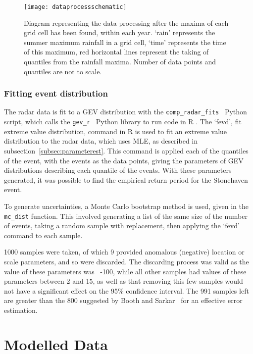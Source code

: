 \begin{figure}[H]
    \centering
    \texttt{[image: dataprocessschematic]}
    \caption[Diagram representing the data processing.]{
        Diagram representing the data processing after the maxima of each grid cell has been found,
    within each year.
    `rain' represents the summer maximum rainfall in a grid cell,
        `time' represents the time of this maximum,
        red horizontal lines represent the taking of quantiles from the rainfall maxima.
    Number of data points and quantiles are not to scale.}
    \label{fig:dataprocessschematic}
\end{figure}

\subsubsection{Fitting event distribution}

The radar data is fit to a GEV distribution with the \texttt{comp\_radar\_fits}~\cite{Me_Code} Python script,
    which calls the \texttt{gev\_r}~\cite{Me_Code} Python library to run code in R .
The `fevd', fit extreme value distribution,
    command in R is used to fit an extreme value distribution to the radar data,
    which uses MLE, as described in subsection~\ref{subsec:parameterest}.
This command is applied each of the quantiles of the event,
    with the events as the data points,
    giving the parameters of GEV distributions describing each quantile of the events.
With these parameters generated,
     it was possible to find the empirical return period for the Stonehaven event.

To generate uncertainties,
    a Monte Carlo bootstrap method is used,
    given in the \texttt{mc\_dist} function.
This involved generating a list of the same size of the number of events,
    taking a random sample with replacement,
    then applying the `fevd' command to each sample.

1000 samples were taken,
    of which 9 provided anomalous (negative) location or scale parameters,
    and so were discarded.
The discarding process was valid as the value of these parameters was ~-100,
    while all other samples had values of these parameters between 2 and 15,
    as well as that removing this few samples would not have a significant effect on the 95\% confidence interval.
The 991 samples left are greater than the 800 suggested by Booth and Sarkar~\cite{Booth_Sarkar_1998}
    for an effective error estimation.

\section{Modelled Data}\label{sec:model}

